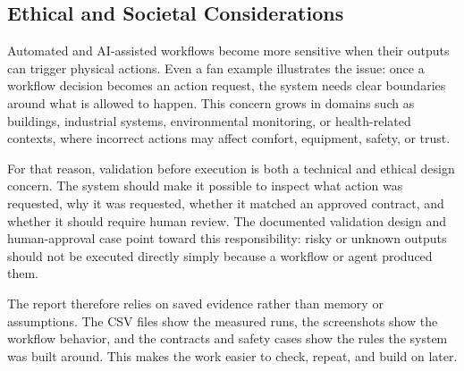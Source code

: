 \subsection{Ethical and Societal Considerations}\label{subsec:discussion-ethical-societal}

Automated and AI-assisted workflows become more sensitive when their outputs can trigger physical actions. Even a fan example illustrates the issue: once a workflow decision becomes an action request, the system needs clear boundaries around what is allowed to happen. This concern grows in domains such as buildings, industrial systems, environmental monitoring, or health-related contexts, where incorrect actions may affect comfort, equipment, safety, or trust.

For that reason, validation before execution is both a technical and ethical design concern. The system should make it possible to inspect what action was requested, why it was requested, whether it matched an approved contract, and whether it should require human review. The documented validation design and human-approval case point toward this responsibility: risky or unknown outputs should not be executed directly simply because a workflow or agent produced them.

The report therefore relies on saved evidence rather than memory or assumptions. The CSV files show the measured runs, the screenshots show the workflow behavior, and the contracts and safety cases show the rules the system was built around. This makes the work easier to check, repeat, and build on later.
